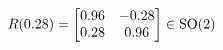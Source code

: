 \documentclass[preview]{standalone}
\begin{document}
\begin{align*}
\special{dvisvgm:raw <g id='unique000'>}R(0.28) = \begin{bmatrix} 0.96 & -0.28 \\ 0.28 & 0.96 \end{bmatrix} \in \text{SO}(2)\special{dvisvgm:raw </g>}
\end{align*}
\end{document}
